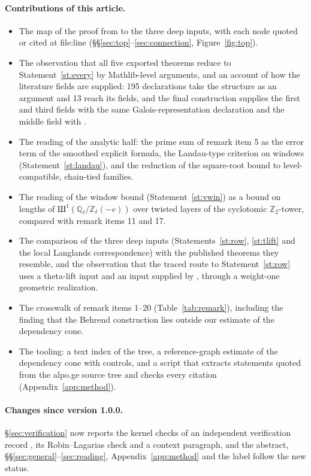 \paragraph{Contributions of this article.}
\begin{itemize}
\item The map of the proof from  to the three deep inputs, with each node
  quoted or cited at file:line (\S\S\ref{sec:top}--\ref{sec:connection}, Figure~\ref{fig:top}).
\item The observation that all five exported theorems reduce to Statement~\ref{st:every} by
  Mathlib-level arguments, and an account of how the literature fields are supplied: 195
  declarations take the structure as an argument and 13 reach its fields, and the final construction
  supplies the first and third fields with the same Galois-representation declaration and the middle
  field with .
\item The reading of the analytic half: the prime sum of remark item 5 as the error term of the
  smoothed explicit formula, the Landau-type criterion on windows (Statement~\ref{st:landau}), and the
  reduction of the square-root bound to level-compatible, chain-tied families.
\item The reading of the window bound (Statement~\ref{st:vwin}) as a bound on lengths of
  $\text{Ш}^1(\mathbb Q_\ell/\mathbb Z_\ell(-e))$ over twisted layers of the cyclotomic
  $\mathbb Z_2$-tower, compared with remark items 11 and 17.
\item The comparison of the three deep inputs (Statements~\ref{st:row}, \ref{st:tlift} and the local
  Langlands correspondence) with the published theorems they resemble, and the observation that the
  traced route to Statement~\ref{st:row} uses a theta-lift input and an input supplied by
  , through a weight-one geometric realization.
\item The crosswalk of remark items 1--20 (Table~\ref{tab:remark}), including the finding that the
  Behrend construction lies outside our estimate of the dependency cone.
\item The tooling: a text index of the tree, a reference-graph estimate of the dependency cone with
  controls, and a script that extracts statements quoted from the alpo.ge source tree and checks every citation
  (Appendix~\ref{app:method}).
\end{itemize}

\paragraph{Changes since version 1.0.0.} \S\ref{sec:verification} now reports the kernel checks of an
independent verification record \cite{sutherland}, its Robin--Lagarias check and a context paragraph,
and the abstract, \S\S\ref{sec:general}--\ref{sec:reading}, Appendix~\ref{app:method} and the
 label follow the new status.

